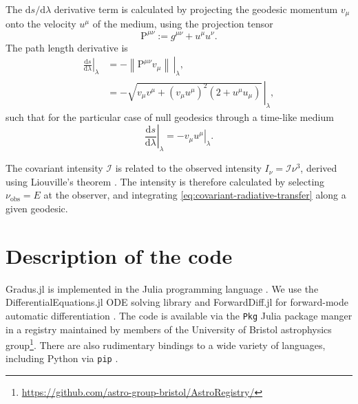 \documentclass[fleqn,usenatbib]{mnras}
\newcommand{\Gradus}{Gradus.jl }
\renewcommand{\d}{\text{d}}
\begin{document}
The $\d s / \d \lambda$ derivative term is calculated by projecting the geodesic momentum $v_\mu$ onto the velocity $u^\mu$ of the medium, using the projection tensor
\begin{equation}
    \mathrm{P}^{\mu\nu} := g^{\mu\nu} + u^\mu u^\nu.
\end{equation}
The path length derivative is 
\begin{align}
    \left. \frac{\d s}{\d \lambda} \right\rvert_\lambda
    &= - \left. \left\lVert \mathrm{P}^{\mu\nu} v_\mu\right\rVert\, \right\rvert_\lambda,\\
    &= - \left. \sqrt{v_\mu v^\mu + \left(v_\mu u^\mu\right)^2 \left(2 + u^\mu u_\mu\right)} \, \right\rvert_\lambda,
\end{align}
such that for the particular case of null geodesics through a time-like medium
\begin{equation}
    \left. \frac{\d s}{\d \lambda} \right\rvert_\lambda = - \left. v_\mu u^\mu \right\rvert_\lambda.
\end{equation}

The covariant intensity $\mathcal{I}$ is related to the observed intensity $I_\nu = \mathcal{I} \nu^3$, derived using Liouville's theorem \citep{todo}. The intensity is therefore calculated by selecting $\nu_\text{obs} = E$ at the observer, and integrating \eqref{eq:covariant-radiative-transfer} along a given geodesic. 


\section{Description of the code}

\Gradus is implemented in the Julia programming language \citep{Bezanson_Julia_A_fresh_2017}. We use the DifferentialEquations.jl ODE solving library and ForwardDiff.jl for forward-mode automatic differentiation \citep{RevelsLubinPapamarkou2016}. The code is available via the \texttt{Pkg} Julia package manger in a registry maintained by members of the University of Bristol astrophysics group\footnote{\url{https://github.com/astro-group-bristol/AstroRegistry/}}. There are also rudimentary bindings to a wide variety of languages, including Python via \texttt{pip} \citep{}.
\end{document}
